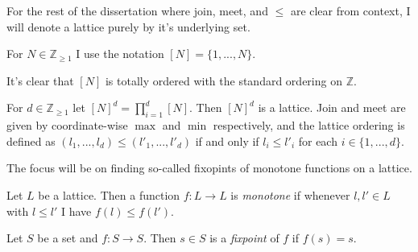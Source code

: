 For the rest of the dissertation where join, meet, and $\leq$ are clear from context, I will denote a lattice purely by it's underlying set.
\begin{notation}
  For $N \in \mathbb{Z}_{\geq 1}$ I use the notation $[N] = \{1, ..., N\}$.
\end{notation}
It's clear that $[N]$ is totally ordered with the standard ordering on $\mathbb{Z}$.
\begin{cor}
  For $d \in \mathbb{Z}_{\geq 1}$ let $[N]^d = \prod_{i=1}^d [N]$. Then $[N]^d$ is a lattice. Join and meet
  are given by coordinate-wise $\max$ and $\min$ respectively, and the lattice ordering is defined as $(l_1, ..., l_d) \leq (l'_1, ..., l'_d)$
  if and only if $l_i \leq l'_i$ for each $i \in \{1, ..., d\}$.
\end{cor}
The focus will be on finding so-called fixopints of monotone functions on a lattice.
\begin{definition}
  Let $L$ be a lattice. Then a function $f : L \to L$ is \emph{monotone} if whenever $l, l' \in L$ with
  $l \leq l'$ I have $f(l) \leq f(l')$.
\end{definition}
\begin{definition}[Fixpoint]
  Let $S$ be a set and $f : S \to S$. Then $s \in S$ is a \emph{fixpoint} of $f$ if $f(s) = s$.
\end{definition}
\newpage

